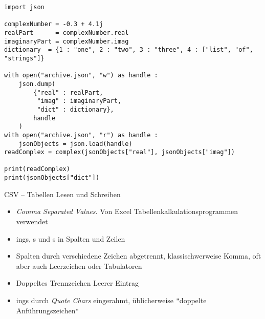 \begin{frame}[fragile]
%
\begin{codebox}
\begin{verbatim}
import json

complexNumber = -0.3 + 4.1j
realPart      = complexNumber.real
imaginaryPart = complexNumber.imag
dictionary  = {1 : "one", 2 : "two", 3 : "three", 4 : ["list", "of", "strings"]}

with open("archive.json", "w") as handle :
    json.dump(
        {"real" : realPart,
         "imag" : imaginaryPart,
         "dict" : dictionary},
        handle
    )
with open("archive.json", "r") as handle :
    jsonObjects = json.load(handle)
readComplex = complex(jsonObjects["real"], jsonObjects["imag"])

print(readComplex)
print(jsonObjects["dict"])
\end{verbatim}
\end{codebox}
%
\end{frame}


\begin{frame}[fragile]{CSV -- Tabellen Lesen und Schreiben}
%
\begin{itemize}
\item \emph{Comma Separated Values}. Von Excel \ua Tabellenkalkulationsprogrammen verwendet
\item {}ings, s und s in Spalten und Zeilen
\item Spalten durch verschiedene Zeichen abgetrennt, klassischwerweise Komma, oft aber auch Leerzeichen oder Tabulatoren
\item Doppeltes Trennzeichen \Thus Leerer Eintrag
\item {}ings durch \emph{Quote Chars} eingerahmt, üblicherweise \texttt{"}doppelte Anführungszeichen\texttt{"}
\end{itemize}
%
\end{frame}


